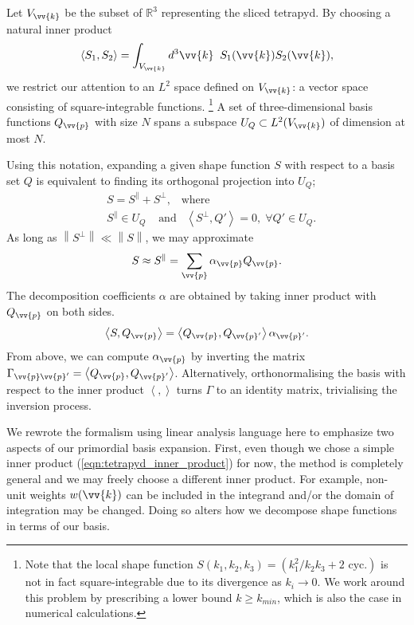 \documentclass[a4paper,12pt,times,custombib,print,index]{Classes/PhDThesisPSnPDF} %
\providecommand{\DIFadd}[1]{{\protect\color{blue}\uwave{#1}}} %
\providecommand{\DIFdel}[1]{{\protect\color{red}\sout{#1}}}                      %
\providecommand{\DIFaddbegin}{} %
\providecommand{\DIFaddend}{} %
\providecommand{\DIFdelbegin}{} %
\providecommand{\DIFdelend}{} %
\newcommand{\DIFscaledelfig}{0.5}
\newlength{\DIFdelgraphicswidth} %
\newlength{\DIFdelgraphicsheight} %
\newcommand{\DIFaddincludegraphics}[2][]{{\color{blue}\fbox{\DIFOincludegraphics[#1]{#2}}}} %
\newcommand{\DIFdelincludegraphics}[2][]{%
\sbox{\DIFdelgraphicsbox}{\DIFOincludegraphics[#1]{#2}}%
\settoboxwidth{\DIFdelgraphicswidth}{\DIFdelgraphicsbox} %
\settoboxtotalheight{\DIFdelgraphicsheight}{\DIFdelgraphicsbox} %
\scalebox{\DIFscaledelfig}{%
\parbox[b]{\DIFdelgraphicswidth}{\usebox{\DIFdelgraphicsbox}\\[-\baselineskip] \rule{\DIFdelgraphicswidth}{0em}}\llap{\resizebox{\DIFdelgraphicswidth}{\DIFdelgraphicsheight}{%
\setlength{\unitlength}{\DIFdelgraphicswidth}%
\begin{picture}(1,1)%
\thicklines\linethickness{2pt} %
{\color[rgb]{1,0,0}\put(0,0){\framebox(1,1){}}}%
{\color[rgb]{1,0,0}\put(0,0){\line( 1,1){1}}}%
{\color[rgb]{1,0,0}\put(0,1){\line(1,-1){1}}}%
\end{picture}%
}\hspace*{3pt}}} %
} %
\DeclareRobustCommand{\DIFaddbegin}{\DIFOaddbegin \let\includegraphics\DIFaddincludegraphics} %
\DeclareRobustCommand{\DIFaddend}{\DIFOaddend \let\includegraphics\DIFOincludegraphics} %
\DeclareRobustCommand{\DIFdelbegin}{\DIFOdelbegin \let\includegraphics\DIFdelincludegraphics} %
\DeclareRobustCommand{\DIFdelend}{\DIFOaddend \let\includegraphics\DIFOincludegraphics} %
\begin{document}
Let $V_{\vv{k}}$ be the subset of $\mathbb{R}^3$ representing the sliced tetrapyd. By choosing a natural inner product
\begin{align}
	\left< S_1, S_2 \right> = \int_{V_{\vv{k}}} d^3\vv{k} \;\; S_1(\vv{k}) S_2(\vv{k}), \label{eqn:tetrapyd_inner_product}
\end{align}
we restrict our attention to an $L^2$ space defined on $V_{\vv{k}}$: a vector space consisting of square-integrable functions.
\footnote{Note that the local shape function $S(k_1,k_2,k_3) = (k_1^2 / k_2 k_3 + \text{2 cyc.})$ is not in fact square-integrable due to its divergence as $k_i \rightarrow 0$. We work around this problem by prescribing a lower bound \DIFdelbegin \DIFdel{$k \ge k_{min}$}\DIFdelend \DIFaddbegin \DIFadd{$k \ge k_\text{min}$}\DIFaddend , which is also the case in numerical calculations.}
A set of three-dimensional basis functions $Q_{\vv{p}}$ with size $N$ spans a subspace $U_{Q} \subset L^2(V_{\vv{k}})$ of dimension at most $N$.

Using this notation, expanding a given shape function $S$ with respect to a basis set $Q$ is equivalent to finding its orthogonal projection into $U_{Q}$;
\begin{align}
	&S = S^{\parallel} + S^{\perp}, \;\;\;\text{where} \\
	&S^{\parallel} \in U_Q \;\;\;\;\text{and} \;\;\; \left< S^{\perp}, Q' \right> = 0, \; \forall Q' \in U_Q.
\end{align}
As long as $\left\| S^\perp \right\| \ll \left\| S \right\|$, we may approximate
\begin{align}
	S \approx S^\parallel = \sum_{\vv{p}} \alpha_{\vv{p}} Q_{\vv{p}}.  \label{eqn:primordial_basis_projection}
\end{align}
The decomposition coefficients $\alpha$ are obtained by taking inner product with $Q_{\vv{p}}$ on both sides.
\begin{align}
	\left< S, Q_\vv{p} \right> = \left< Q_\vv{p}, Q_{\vv{p}'} \right> \alpha_{\vv{p}'}. \label{eqn:primordial_basis_expansion_SQ_and_QQ}
\end{align}
From above, we can compute $\alpha_\vv{p}$ by inverting the matrix $\Gamma_{\vv{p} \vv{p}'} = \left< Q_\vv{p}, Q_{\vv{p}'} \right>$. Alternatively, orthonormalising the basis with respect to the inner product $\left< , \right>$ turns $\Gamma$ to an identity matrix, trivialising the inversion process.

We rewrote the formalism using linear analysis language here to emphasize two aspects of our primordial basis expansion. First, even though we chose a simple inner product (\ref{eqn:tetrapyd_inner_product}) for now, the method is completely general and we may freely choose a different inner product. For example, non-unit weights $w(\vv{k})$ can be included in the integrand and/or the domain of integration may be changed. Doing so alters how we decompose shape functions in terms of our basis.
\end{document}
